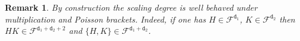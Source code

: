 \documentclass[reqno,11pt]{amsart}
\theoremstyle{plain}
\numberwithin{equation}{section}
\newtheorem{rmk}[thm]{Remark}
\newtheorem{prop}[thm]{Proposition}
\newtheorem{lemma}[theorem]{Lemma}
\newcommand{\N}{\mathbb{N}}
\newcommand{\Z}{\mathbb{Z}}
\newcommand{\bal}{{\bf \alpha}}
\newcommand{\bbt}{{\bf \beta}}
\newcommand{\be}{{\bf e}}
\newcommand{\cF}{{\mathcal F}}
\newcommand{\im}{{\rm i}}
\newcommand{\cM}{{\mathcal M}}
\newcommand{\td}{{\mathtt{d}}}
\newcommand{\set}[1]{{\left\{#1\right\}}}
\newcommand{\bcoeffu}[1]{#1_{\bal^{1},\bbt^{1}}}
\newcommand{\bcoeffd}[1]{#1_{\bal^{2},\bbt^{2}}}
\newcommand{\aluno}{\alpha^{1}}
\newcommand{\aldue}{\alpha^{2}}
\newcommand{\btuno}{\beta^{1}}
\newcommand{\btdue}{\beta^{2}}
\newcommand{\al}{{\alpha}}
\newcommand{\bt}{{\beta}}
\newcommand{\pa}[1]{{\left(#1\right)}}
\begin{document}
{\begin{rmk}
	By construction  the scaling degree is well behaved under multiplication and Poisson brackets. Indeed, if one has $H\in\cF^{\td_1}$, $K\in\cF^{\td_2}$  then $H K\in\cF^{\td_1+\td_2+2}$ and $\{H,K\} \in\cF^{\td_1+\td_2}$.
\end{rmk}
}
\end{document}
